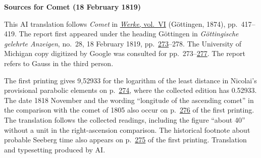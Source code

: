 \clearpage\thispagestyle{empty}
\begin{center}\textbf{Sources for Comet (18 February 1819)}\end{center}
\noindent This AI translation follows \textit{Comet} in \href{https://gdz.sub.uni-goettingen.de/id/PPN236007467}{\textit{Werke}, vol.~VI} (Göttingen, 1874), pp.~417--419. The report first appeared under the heading Göttingen in \textit{Göttingische gelehrte Anzeigen}, no.~28, 18 February 1819, pp.~\href{https://books.google.com/books?id=CAQEAAAAMAAJ&pg=PA273}{273}--278. The University of Michigan copy digitized by Google was consulted for pp.~273--\href{https://books.google.com/books?id=CAQEAAAAMAAJ&pg=PA277}{277}. The report refers to Gauss in the third person.
\par\smallskip\noindent The first printing gives 9,52933 for the logarithm of the least distance in Nicolai’s provisional parabolic elements on p.~\href{https://books.google.com/books?id=CAQEAAAAMAAJ&pg=PA274}{274}, where the collected edition has 0.52933. The date 1818 November and the wording “longitude of the ascending comet” in the comparison with the comet of 1805 also occur on p.~\href{https://books.google.com/books?id=CAQEAAAAMAAJ&pg=PA276}{276} of the first printing. The translation follows the collected readings, including the figure “about 40” without a unit in the right-ascension comparison. The historical footnote about probable Seeberg time also appears on p.~\href{https://books.google.com/books?id=CAQEAAAAMAAJ&pg=PA275}{275} of the first printing. Translation and typesetting produced by AI.
\clearpage
